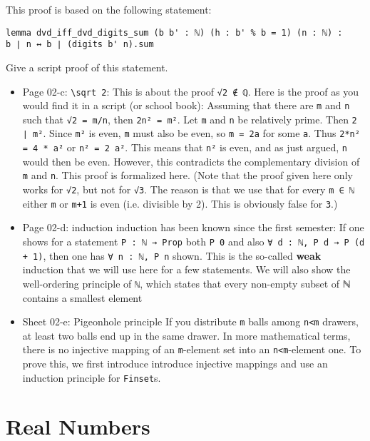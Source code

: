 \documentclass{memoir}
\begin{document}
This proof is based on the following statement:

\begin{verbatim}
lemma dvd_iff_dvd_digits_sum (b b' : ℕ) (h : b' % b = 1) (n : ℕ) :
b ∣ n ↔ b ∣ (digits b' n).sum

\end{verbatim}


Give a script proof of this statement.

\begin{itemize}
\item Page 02-c: \Verb|\sqrt 2|:
     This is about the proof \Verb|√2 ∉ ℚ|. Here is the proof as you would find it in a script (or school book): Assuming that there are \Verb|m| and \Verb|n| such that \Verb|√2 = m/n|, then  \Verb|2n² = m²|. Let \Verb|m| and \Verb|n| be relatively prime. Then \Verb|2 ∣ m²|. Since \Verb|m²| is even, \Verb|m| must also be even, so \Verb|m = 2a| for some \Verb|a|. Thus \Verb|2*n² = 4 * a²| or \Verb|n² = 2 a²|. This means that \Verb|n²| is even, and as just argued, \Verb|n| would then be even. However, this contradicts the complementary division of \Verb|m| and \Verb|n|. This proof is formalized here. (Note that the proof given here only works for \Verb|√2|, but not for \Verb|√3|. The reason is that we use that for every \Verb|m ∈ ℕ| either \Verb|m| or \Verb|m+1| is even (i.e. divisible by 2). This is obviously false for \Verb|3|.)\item Page 02-d: induction
    induction has been known since the first semester: If one shows for a statement \Verb|P : ℕ → Prop| both \Verb|P 0| and also \Verb|∀ d : ℕ, P d → P (d + 1)|, then one has \Verb|∀ n : ℕ, P n| shown. This is the so-called \textbf{weak}    induction that we will use here for a few statements. We will also show the well-ordering principle of \Verb|ℕ|, which states that every non-empty subset of ℕ contains a smallest element\item Sheet 02-e: Pigeonhole principle
   If you distribute \Verb|m| balls among \Verb|n<m| drawers, at least two balls end up in the same drawer. In more mathematical terms, there is no injective mapping of an \Verb|m|-element set into an \Verb|n<m|-element one. To prove this, we first introduce introduce injective mappings and use an induction principle for \Verb|Finset|s.
\end{itemize}




\section{Real Numbers}
\end{document}
